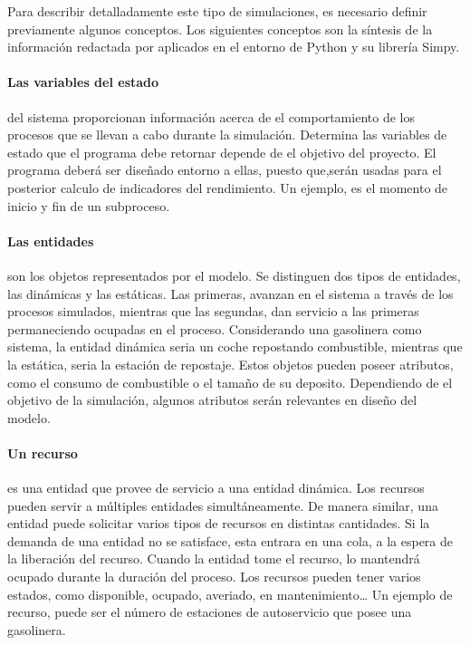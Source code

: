 Para describir detalladamente este tipo de simulaciones,
es necesario definir previamente algunos conceptos.
Los siguientes conceptos
son la síntesis de la información redactada por \citep{banks1998handbook}
aplicados en el entorno de Python y su librería Simpy.

\paragraph{Las variables del estado}
del sistema proporcionan información
acerca de el comportamiento de los procesos
que se llevan a cabo durante la simulación.
Determina las variables de estado que el programa debe retornar
depende de el objetivo del proyecto.
El programa deberá ser diseñado entorno a ellas,
puesto que,serán usadas
para el posterior calculo de indicadores del rendimiento.
Un ejemplo, es el momento de inicio y fin de un subproceso.

\paragraph{Las entidades}
son los objetos representados por el modelo.
Se distinguen dos tipos de entidades,
las dinámicas y las estáticas.
Las primeras, avanzan en el sistema
a través de los procesos simulados, 
mientras que las segundas, dan servicio a las primeras
permaneciendo ocupadas en el proceso.
Considerando una gasolinera como sistema,
la entidad dinámica seria un coche repostando combustible,
mientras que la estática, seria la estación de repostaje.
Estos objetos pueden poseer atributos,
como el consumo de combustible o el tamaño de su deposito.
Dependiendo de el objetivo de la simulación,
algunos atributos serán relevantes en diseño del modelo.

\paragraph{Un recurso}
es una entidad
que provee de servicio a una entidad dinámica.
Los recursos pueden servir a múltiples entidades simultáneamente.
De manera similar, una entidad puede
solicitar varios tipos de recursos en distintas cantidades.
Si la demanda de una entidad no se satisface,
esta entrara en una cola,
a la espera de la liberación del recurso.
Cuando la entidad tome el recurso,
lo mantendrá ocupado durante la duración del proceso.
Los recursos pueden tener varios estados,
como disponible, ocupado, averiado, en mantenimiento\ldots
Un ejemplo de recurso, puede ser el número de
estaciones de autoservicio que posee una gasolinera.

